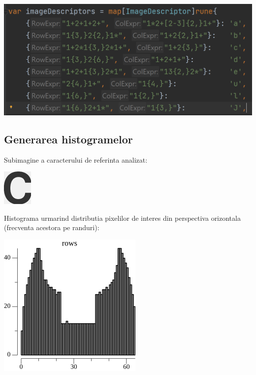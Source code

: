 \documentclass[10pt]{article}
\begin{document}
\begin{center}

  \includegraphics[scale=0.6]{model-expresii}
  
\end{center}
  
\newpage

\subsection{Generarea histogramelor}

\> Subimagine a caracterului de referinta analizat:

\begin{center}

  \includegraphics[scale=1]{hist-image}
  
\end{center}

\> Histograma urmarind distributia pixelilor de interes din perspectiva orizontala (frecventa acestora pe randuri):

\begin{center}

  \includegraphics[scale=0.5]{hist-rows}
  
\end{center}
\end{document}
